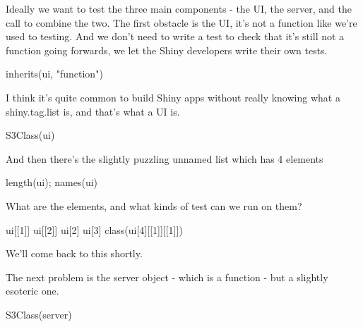 \documentclass[
  letterpaper,
  DIV=11,
  numbers=noendperiod]{scrreprt}
\newenvironment{Shaded}{\begin{snugshade}}{\end{snugshade}}
\newcommand{\DecValTok}[1]{\textcolor[rgb]{0.68,0.00,0.00}{#1}}
\newcommand{\FunctionTok}[1]{\textcolor[rgb]{0.28,0.35,0.67}{#1}}
\newcommand{\NormalTok}[1]{\textcolor[rgb]{0.00,0.23,0.31}{#1}}
\newcommand{\StringTok}[1]{\textcolor[rgb]{0.13,0.47,0.30}{#1}}
\begin{document}
Ideally we want to test the three main components - the UI, the server,
and the call to combine the two. The first obstacle is the UI, it's not
a function like we're used to testing. And we don't need to write a test
to check that it's still not a function going forwards, we let the Shiny
developers write their own tests.

\begin{Shaded}
\begin{Highlighting}[]
\FunctionTok{inherits}\NormalTok{(ui, }\StringTok{"function"}\NormalTok{)}
\end{Highlighting}
\end{Shaded}

I think it's quite common to build Shiny apps without really knowing
what a shiny.tag.list is, and that's what a UI is.

\begin{Shaded}
\begin{Highlighting}[]
\FunctionTok{S3Class}\NormalTok{(ui)}
\end{Highlighting}
\end{Shaded}

And then there's the slightly puzzling unnamed list which has 4 elements

\begin{Shaded}
\begin{Highlighting}[]
\FunctionTok{length}\NormalTok{(ui); }\FunctionTok{names}\NormalTok{(ui)}
\end{Highlighting}
\end{Shaded}

What are the elements, and what kinds of test can we run on them?

\begin{Shaded}
\begin{Highlighting}[]
\NormalTok{ui[[}\DecValTok{1}\NormalTok{]]}
\NormalTok{ui[[}\DecValTok{2}\NormalTok{]]}
\NormalTok{ui[}\DecValTok{2}\NormalTok{]}
\NormalTok{ui[}\DecValTok{3}\NormalTok{]}
\FunctionTok{class}\NormalTok{(ui[}\DecValTok{4}\NormalTok{][[}\DecValTok{1}\NormalTok{]][[}\DecValTok{1}\NormalTok{]])}
\end{Highlighting}
\end{Shaded}

We'll come back to this shortly.

The next problem is the server object - which is a function - but a
slightly esoteric one.

\begin{Shaded}
\begin{Highlighting}[]
\FunctionTok{S3Class}\NormalTok{(server)}
\end{Highlighting}
\end{Shaded}
\end{document}
